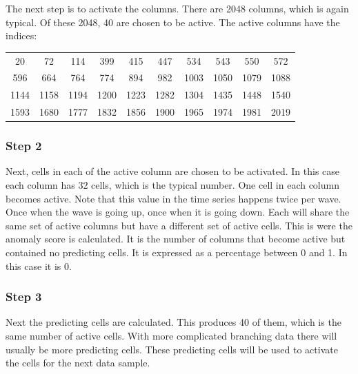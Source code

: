 \documentclass[a4paper]{jpconf}
\begin{document}
			The next step is to activate the columns. There are 2048 columns, which is again typical. Of these 2048, 40 are chosen to be active. The active columns have the indices:
			\begin{table}[h]
			\begin{center}
			\begin{tabular}{cccccccccc}
			20& 72& 114& 399& 415& 447& 534& 543& 550& 572\\
			596& 664& 764& 774& 894& 982& 1003& 1050& 1079& 1088\\
			1144& 1158& 1194& 1200& 1223& 1282& 1304& 1435& 1448& 1540\\
			1593& 1680& 1777& 1832& 1856& 1900& 1965& 1974& 1981& 2019\\
			\end{tabular}
			\end{center}
			\end{table}

		\subsubsection*{Step 2}
			Next, cells in each of the active column are chosen to be activated. In this case each column has 32 cells, which is the typical number. One cell in each column becomes active. Note that this value in the time series happens twice per wave. Once when the wave is going up, once when it is going down. Each will share the same set of active columns but have a different set of active cells.
			This is were the anomaly score is calculated. It is the number of columns that become active but contained no predicting cells. It is expressed as a percentage between 0 and 1. In this case it is 0.
		\subsubsection*{Step 3}
			Next the predicting cells are calculated. This produces 40 of them, which is the same number of active cells. With more complicated branching data there will usually be more predicting cells. These predicting cells will be used to activate the cells for the next data sample.
		
\end{document}
